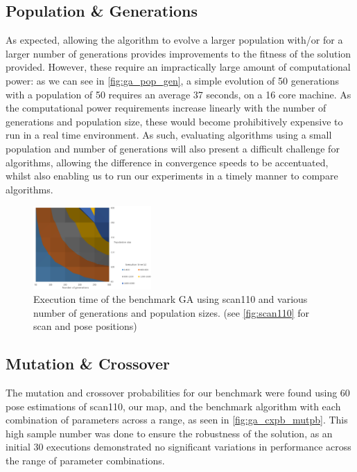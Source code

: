 \documentclass[authoryearcitations]{UoYCSproject}
\begin{document}
\subsection{Population \& Generations}
As expected, allowing the algorithm to evolve a larger population with/or for a larger number of generations provides improvements to the fitness of the solution provided. However, these require an impractically large amount of computational power: as we can see in \autoref{fig:ga_pop_gen}, a simple evolution of 50 generations with a population of 50 requires an average 37 seconds, on a 16 core machine. As the computational power requirements increase linearly with the number of generations and population size, these would become prohibitively expensive to run in a real time environment. As such, evaluating algorithms using a small population and number of generations will also present a difficult challenge for algorithms, allowing the difference in convergence speeds to be accentuated, whilst also enabling us to run our experiments in a timely manner to compare algorithms. 
\begin{figure}[ht]
\centering
	\includegraphics[width=0.4\textwidth,keepaspectratio]{images/ga_pop_gen_sweep.png}
	\caption{Execution time of the benchmark GA using scan110 and various number of generations and population sizes. (see \autoref{fig:scan110} for scan and pose positions)}
	\label{fig:ga_pop_gen}
\end{figure}

\subsection{Mutation \& Crossover}
\label{subsec:benchmark_mutpb_cxpb}
The mutation and crossover probabilities for our benchmark were found using 60 pose estimations of scan110, our map, and the benchmark algorithm with each combination of parameters across a range, as seen in \autoref{fig:ga_cxpb_mutpb}. This high sample number was done to ensure the robustness of the solution, as an initial 30 executions demonstrated no significant variations in performance across the range of parameter combinations. \newline
\end{document}

